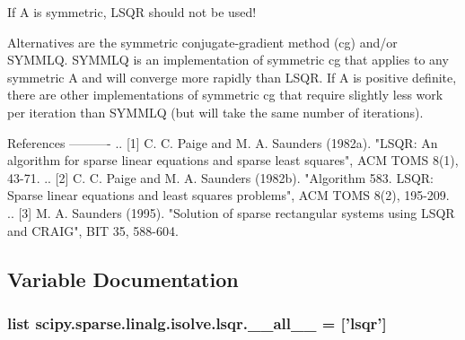 \begin{DoxyVerb}
If A is symmetric, LSQR should not be used!

Alternatives are the symmetric conjugate-gradient method (cg)
and/or SYMMLQ.  SYMMLQ is an implementation of symmetric cg that
applies to any symmetric A and will converge more rapidly than
LSQR.  If A is positive definite, there are other implementations
of symmetric cg that require slightly less work per iteration than
SYMMLQ (but will take the same number of iterations).

References
----------
.. [1] C. C. Paige and M. A. Saunders (1982a).
       "LSQR: An algorithm for sparse linear equations and
       sparse least squares", ACM TOMS 8(1), 43-71.
.. [2] C. C. Paige and M. A. Saunders (1982b).
       "Algorithm 583.  LSQR: Sparse linear equations and least
       squares problems", ACM TOMS 8(2), 195-209.
.. [3] M. A. Saunders (1995).  "Solution of sparse rectangular
       systems using LSQR and CRAIG", BIT 35, 588-604.\end{DoxyVerb}
 

\subsection{Variable Documentation}
\hypertarget{namespacescipy_1_1sparse_1_1linalg_1_1isolve_1_1lsqr_ad612600fe23bc04f2f65f127e3b93d1c}{}
\subsubsection[{\+\_\+\+\_\+all\+\_\+\+\_\+}]{\setlength{\rightskip}{0pt plus 5cm}list scipy.\+sparse.\+linalg.\+isolve.\+lsqr.\+\_\+\+\_\+all\+\_\+\+\_\+ = \mbox{[}'{\bf lsqr}'\mbox{]}}\label{namespacescipy_1_1sparse_1_1linalg_1_1isolve_1_1lsqr_ad612600fe23bc04f2f65f127e3b93d1c}
